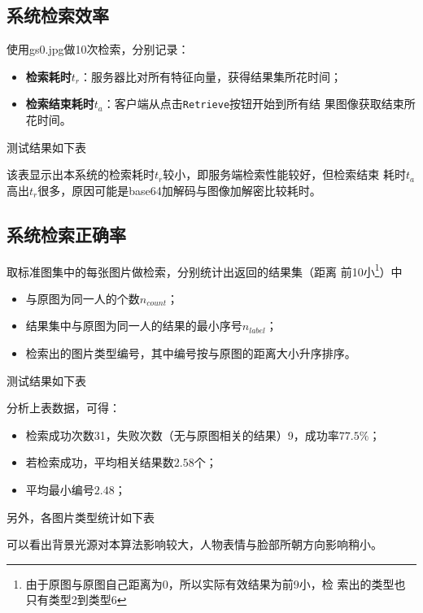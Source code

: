 \subsection{系统检索效率}
\label{sec:sys-retrieval-effi}

使用gs0.jpg做10次检索，分别记录：
\begin{itemize}
  \item \textbf{检索耗时$t_r$}：服务器比对所有特征向量，获得结果集所花时间；
  \item \textbf{检索结束耗时$t_a$}：客户端从点击\texttt{Retrieve}按钮开始到所有结
    果图像获取结束所花时间。
\end{itemize}

测试结果如下表



该表显示出本系统的检索耗时$t_r$较小，即服务端检索性能较好，但检索结束
耗时$t_a$高出$t_r$很多，原因可能是base64加解码与图像加解密比较耗时。

\subsection{系统检索正确率}
\label{sec:sys-retrieval-correct-rate}

取标准图集中的每张图片做检索，分别统计出返回的结果集（距离
前10小\footnote{由于原图与原图自己距离为0，所以实际有效结果为前9小，检
  索出的类型也只有类型2到类型6}）中

\begin{itemize}
  \item 与原图为同一人的个数$n_{count}$；
  \item 结果集中与原图为同一人的结果的最小序号$n_{label}$；
  \item 检索出的图片类型编号，其中编号按与原图的距离大小升序排序。
\end{itemize}


测试结果如下表

\newpage


分析上表数据，可得：
\begin{itemize}
  \item 检索成功次数31，失败次数（无与原图相关的结果）9，成功率$77.5\%$；
  \item 若检索成功，平均相关结果数$2.58$个；
  \item 平均最小编号$2.48$；
\end{itemize}

另外，各图片类型统计如下表



可以看出背景光源对本算法影响较大，人物表情与脸部所朝方向影响稍小。

